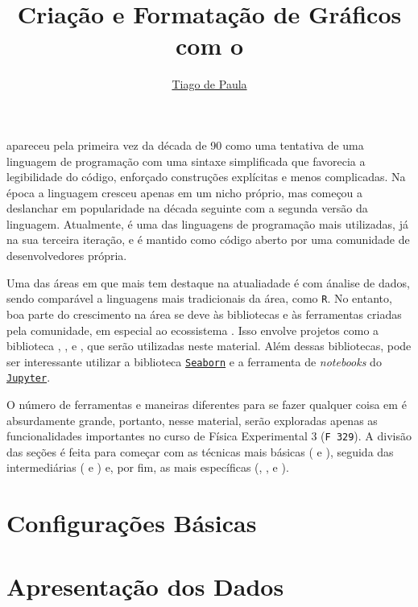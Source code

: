 \documentclass{article}
\title{Criação e Formatação de Gráficos com o}\softwarelogo
\author{\href{mailto:t187679@dac.unicamp.br}{Tiago de Paula}}
\date{}
\begin{document}
    \maketitle

    \software apareceu pela primeira vez da década de 90 como uma tentativa de uma linguagem de programação com uma sintaxe simplificada que favorecia a legibilidade do código, enforçado construções explícitas e menos complicadas. Na época a linguagem cresceu apenas em um nicho próprio, mas começou a deslanchar em popularidade na década seguinte com a segunda versão da linguagem. Atualmente, \software é uma das linguagens de programação mais utilizadas, já na sua terceira iteração, e é mantido como código aberto por uma comunidade de desenvolvedores própria.

    Uma das áreas em que \software mais tem destaque na atualiadade é com ánalise de dados, sendo comparável a linguagens mais tradicionais da área, como \texttt{R}. No entanto, boa parte do crescimento na área se deve às bibliotecas e às ferramentas criadas pela comunidade, em especial ao ecossistema \href{https://scipy.org/index.html}{\scipy}. Isso envolve projetos como a biblioteca \href{https://scipy.org/scipylib/index.html}{\scipy}, \href{http://www.numpy.org/}{\numpy}, \href{https://matplotlib.org/}{\matplotlib} e \href{http://pandas.pydata.org/}{\pandas}, que serão utilizadas neste material. Além dessas bibliotecas, pode ser interessante utilizar a biblioteca \href{https://seaborn.pydata.org/}{\texttt{Seaborn}} e a ferramenta de \textit{notebooks} do \href{https://jupyter.org/}{\texttt{Jupyter}}.

    O número de ferramentas e maneiras diferentes para se fazer qualquer coisa em \software é absurdamente grande, portanto, nesse material, serão exploradas apenas as funcionalidades importantes no curso de Física Experimental 3 (\texttt{F 329}). A divisão das seções é feita para começar com as técnicas mais básicas ( e ), seguida das intermediárias ( e ) e, por fim, as mais específicas (, ,  e ).

    \section{Configurações Básicas} \label{sec:basico}
        

    \section{Apresentação dos Dados} \label{sec:reta}
        
\end{document}
